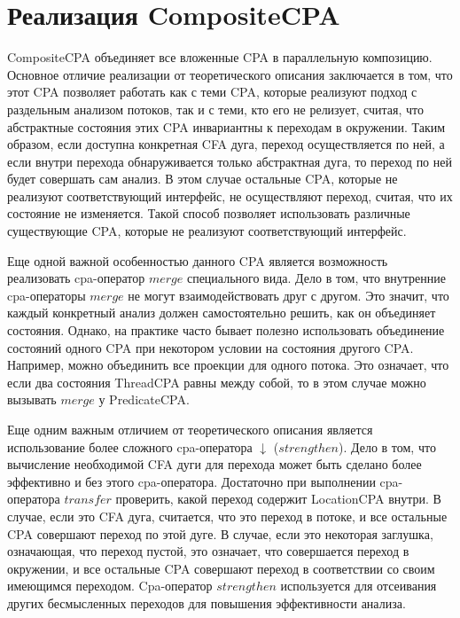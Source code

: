 \section{Реализация CompositeCPA}
\label{sect_impl_composite}

CompositeCPA объединяет все вложенные CPA в параллельную композицию.
Основное отличие реализации от теоретического описания заключается в том, что этот CPA позволяет работать как с теми CPA, которые реализуют подход с раздельным анализом потоков, так и с теми, кто его не релизует, считая, что абстрактные состояния этих CPA инвариантны к переходам в окружении. 
Таким образом, если доступна конкретная CFA дуга, переход осуществляется по ней, а если внутри перехода обнаруживается только абстрактная дуга, то переход по ней будет совершать сам анализ. 
В этом случае остальные CPA, которые не реализуют соответствующий интерфейс, не осуществляют переход, считая, что их состояние не изменяется.
Такой способ позволяет использовать различные существующие CPA, которые не реализуют соответствующий интерфейс.

Еще одной важной особенностью данного CPA является возможность реализовать cpa-оператор $merge$ специального вида. 
Дело в том, что внутренние cpa-операторы $merge$ не могут взаимодействовать друг с другом. 
Это значит, что каждый конкретный анализ должен самостоятельно решить, как он объединяет состояния.
Однако, на практике часто бывает полезно использовать объединение состояний одного CPA при некотором условии на состояния другого CPA.
Например, можно объединить все проекции для одного потока.
Это означает, что если два состояния ThreadCPA равны между собой, то в этом случае можно вызывать $merge$ у PredicateCPA.

Еще одним важным отличием от теоретического описания является использование более сложного cpa-оператора $\downarrow$ ($strengthen$). 
Дело в том, что вычисление необходимой CFA дуги для перехода может быть сделано более эффективно и без этого cpa-оператора.
Достаточно при выполнении cpa-оператора $transfer$ проверить, какой переход содержит LocationCPA внутри. 
В случае, если это CFA дуга, считается, что это переход в потоке, и все остальные CPA совершают переход по этой дуге.
В случае, если это некоторая заглушка, означающая, что переход пустой, это означает, что совершается переход в окружении, и все остальные CPA совершают переход в соответствии со своим имеющимся переходом.
Cpa-оператор $strengthen$ используется для отсеивания других бесмысленных переходов для повышения эффективности анализа.

